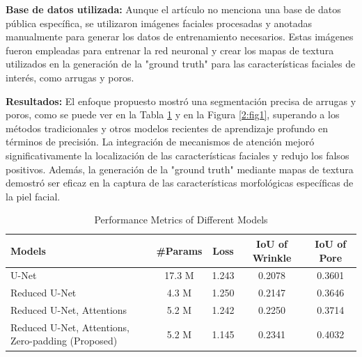 \textbf{Base de datos utilizada:}
Aunque el artículo no menciona una base de datos pública específica, se utilizaron imágenes faciales procesadas y anotadas manualmente para generar los datos de entrenamiento necesarios. Estas imágenes fueron empleadas para entrenar la red neuronal y crear los mapas de textura utilizados en la generación de la "ground truth" para las características faciales de interés, como arrugas y poros.

\textbf{Resultados:}
El enfoque propuesto mostró una segmentación precisa de arrugas y poros, como se puede ver en la Tabla \ref{tab:models_performance} y en la Figura \ref{2:fig1}, superando a los métodos tradicionales y otros modelos recientes de aprendizaje profundo en términos de precisión. La integración de mecanismos de atención mejoró significativamente la localización de las características faciales y redujo los falsos positivos. Además, la generación de la "ground truth" mediante mapas de textura demostró ser eficaz en la captura de las características morfológicas específicas de la piel facial.

\begin{table}[h!]
    \centering
    \caption{Performance Metrics of Different Models}
    \renewcommand{\arraystretch}{1.2} %
    \setlength{\tabcolsep}{5pt} %
    \begin{tabularx}{\textwidth}{@{}X c c c c@{}}
        \toprule
        \textbf{Models} & \textbf{\#Params} & \textbf{Loss} & \textbf{IoU of Wrinkle} & \textbf{IoU of Pore} \\ \midrule
        U-Net & 17.3 M & 1.243 & 0.2078 & 0.3601 \\
        Reduced U-Net & 4.3 M & 1.250 & 0.2147 & 0.3646 \\
        Reduced U-Net, Attentions & 5.2 M & 1.242 & 0.2250 & 0.3714 \\
        Reduced U-Net, Attentions, Zero-padding (Proposed) & 5.2 M & 1.145 & 0.2341 & 0.4032 \\ 
        \bottomrule
    \end{tabularx}
    \label{tab:models_performance}
\end{table}


